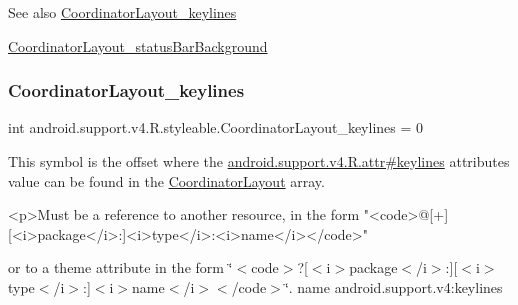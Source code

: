 \begin{DoxySeeAlso}{See also}
\hyperlink{classandroid_1_1support_1_1v4_1_1R_1_1styleable_a45331911c9dab41ebfce37bf8248393e}{Coordinator\+Layout\+\_\+keylines} 

\hyperlink{classandroid_1_1support_1_1v4_1_1R_1_1styleable_aaae28c830112a89e52658afe0c8b24dc}{Coordinator\+Layout\+\_\+status\+Bar\+Background} 
\end{DoxySeeAlso}
\mbox{\label{classandroid_1_1support_1_1v4_1_1R_1_1styleable_a45331911c9dab41ebfce37bf8248393e}} 
\subsubsection{\texorpdfstring{Coordinator\+Layout\+\_\+keylines}{CoordinatorLayout\_keylines}}
{\footnotesize\ttfamily int android.\+support.\+v4.\+R.\+styleable.\+Coordinator\+Layout\+\_\+keylines = 0\hspace{0.3cm}{\ttfamily [static]}}

This symbol is the offset where the \hyperlink{classandroid_1_1support_1_1v4_1_1R_1_1attr_a268b3fabe0ef0d9222f43931b0af5d39}{android.\+support.\+v4.\+R.\+attr\#keylines} attribute\textquotesingle{}s value can be found in the \hyperlink{classandroid_1_1support_1_1v4_1_1R_1_1styleable_a94a213ce8a987dc40a09f872e7b309c5}{Coordinator\+Layout} array.

\begin{DoxyVerb}      <p>Must be a reference to another resource, in the form "<code>@[+][<i>package</i>:]<i>type</i>:<i>name</i></code>"
\end{DoxyVerb}
 or to a theme attribute in the form \char`\"{}$<$code$>$?\mbox{[}$<$i$>$package$<$/i$>$\+:\mbox{]}\mbox{[}$<$i$>$type$<$/i$>$\+:\mbox{]}$<$i$>$name$<$/i$>$$<$/code$>$\char`\"{}.  name android.\+support.\+v4\+:keylines \mbox{\label{classandroid_1_1support_1_1v4_1_1R_1_1styleable_a9b9df68895be97c43703c5d0a130e2d9}} 
